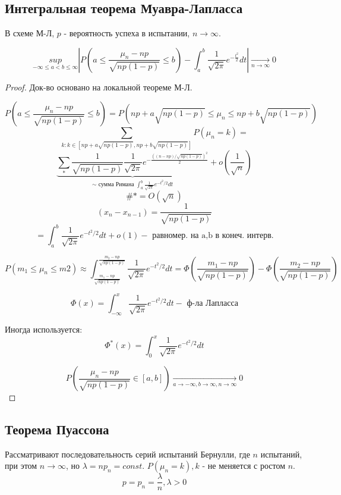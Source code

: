 \subsection{Интегральная теорема Муавра-Лапласса}

\begin{theorem}
	В схеме М-Л, $p$ - вероятность успеха в испытании, $n \to \infty$.
	
	\[ \underset{-\infty \le a < b \le \infty}{sup} \left| P \left( a \le \dfrac{\mu_n - np}{\sqrt{np(1 - p)}} \le b \right) - \int_{a}^{b} \dfrac{1}{\sqrt{2 \pi}} e^{-\frac{t^2}{2}}dt \right| \underset{n \to \infty}{\to} 0 \]
	
	\begin{proof}
		Док-во основано на локальной теореме М-Л.
		
		\[ P \left( a \le \dfrac{\mu_n - np}{\sqrt{np(1-p)}} \le b \right) = P(np + a\sqrt{np(1-p)} \le \mu_n \le np + b\sqrt{np(1-p)}) \]
		\[ \underset{k: k \in [np+a\sqrt{np(1-p)}, np + b\sqrt{np(1-p)}]}{\sum} P(\mu_n = k) =  \]
		\[ \underbrace{\sum_{*} \dfrac{1}{\sqrt{np(1-p)}} \dfrac{1}{\sqrt{2 \pi}} e^{-\frac{((n-np)/\sqrt{np(1-p)})^2}{2}}}_{\sim \text{ сумма Римана } \int_{a}^b \frac{1}{\sqrt{2 \pi}}e^{-t^2/2}dt} + o\left(\dfrac{1}{\sqrt{n}}\right) \]
		\[ \#* = O(\sqrt{n}) \]
		\[ (x_n - x_{n-1}) = \dfrac{1}{\sqrt{np(1-p)}} \]
		\[ = \int_{a}^b \dfrac{1}{\sqrt{2 \pi}} e^{-t^2/2}dt + o(1) - \text{ равномер. на a,b в конеч. интерв.} \]
		
		\[ P(m_1 \le \mu_n \le m2) \approx \int_{\frac{m_1-np}{\sqrt{np(1-p)}}}^{\frac{m_2-np}{\sqrt{np(1-p)}}} \dfrac{1}{\sqrt{2 \pi}} e^{-t^2/2}dt = \Phi \left( \dfrac{m_1-np}{\sqrt{np(1-p)}} \right) - \Phi \left( \dfrac{m_2-np}{\sqrt{np(1-p)}} \right) \]

		\[ \Phi(x) = \int_{-\infty}^{x} \dfrac{1}{\sqrt{2 \pi}} e^{-t^2/2}dt - \text{ ф-ла Лапласса} \]
		
		Иногда используется:
		\[ \Phi^*(x) = \int_{0}^{x} \dfrac{1}{\sqrt{2 \pi}} e^{-t^2/2}dt \]
		
		\[ P \left( \dfrac{\mu_n - np}{\sqrt{np(1-p)}} \in [a,b] \right) \underset{a \to - \infty, b \to \infty, n \to \infty}{\to} 0 \]
	\end{proof}
\end{theorem}

\subsection{Теорема Пуассона}

\begin{definition}
	Рассматривают последовательность серий испытаний Бернулли, где $n$ испытаний, при этом $n \to \infty$, но $\lambda = n p_n = const$. $P(\mu_n = k), k$ - не меняется с ростом $n$.
	\[ p = p_n = \dfrac{\lambda}{n}, \lambda > 0 \]
\end{definition}

